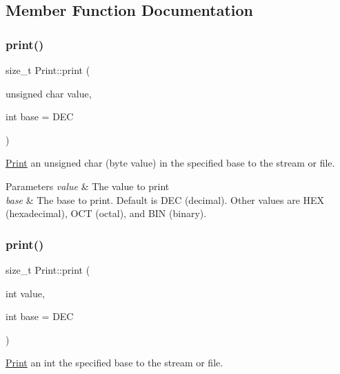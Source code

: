 \subsection{Member Function Documentation}
\mbox{\label{class_print_ae35481e77567618140cd58d8b96d3747}} 
\subsubsection{\texorpdfstring{print()}{print()}\hspace{0.1cm}{\footnotesize\ttfamily [1/6]}}
{\footnotesize\ttfamily size\+\_\+t Print\+::print (\begin{DoxyParamCaption}\item[{unsigned char}]{value,  }\item[{int}]{base = {\ttfamily DEC} }\end{DoxyParamCaption})}



\mbox{\hyperlink{class_print}{Print}} an unsigned char (byte value) in the specified base to the stream or file. 


\begin{DoxyParams}{Parameters}
{\em value} & The value to print \\
\hline
{\em base} & The base to print. Default is D\+EC (decimal). Other values are H\+EX (hexadecimal), O\+CT (octal), and B\+IN (binary). \\
\hline
\end{DoxyParams}
\mbox{\label{class_print_aa28ddbde83b14df73b41c919ecc4478f}} 
\subsubsection{\texorpdfstring{print()}{print()}\hspace{0.1cm}{\footnotesize\ttfamily [2/6]}}
{\footnotesize\ttfamily size\+\_\+t Print\+::print (\begin{DoxyParamCaption}\item[{int}]{value,  }\item[{int}]{base = {\ttfamily DEC} }\end{DoxyParamCaption})}



\mbox{\hyperlink{class_print}{Print}} an int the specified base to the stream or file. 


